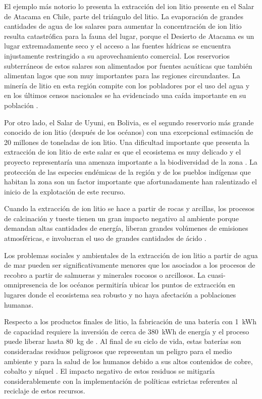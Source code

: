 El ejemplo más notorio lo presenta la extracción del ion litio presente en el Salar de Atacama en Chile, parte del triángulo del litio. La evaporación de grandes cantidades de agua de los salares para aumentar la concentración de ion litio resulta catastrófica para la fauna del lugar, porque el Desierto de Atacama es un lugar extremadamente seco y el acceso a las fuentes hídricas se encuentra injustamente restringido a su aprovechamiento comercial. Los reservorios subterráneos de estos salares son alimentados por fuentes acuáticas que también alimentan lagos que son muy importantes para las regiones circundantes. La minería de litio en esta región compite con los pobladores por el uso del agua y en los últimos  censos nacionales se ha evidenciado una caída importante en su población \citep{Romero2012, LIU202012}.

Por otro lado, el Salar de Uyuni, en Bolivia, es el segundo reservorio más grande conocido de ion litio (después de los océanos) con una excepcional estimación de 20 millones de toneladas de ion litio. Una dificultad importante que presenta la extracción de ion litio de este salar es que el ecosistema es muy delicado y el proyecto representaría una amenaza importante a la biodiversidad de la zona \citep{Hancock2018}. La protección de las especies endémicas de la región y de los pueblos indígenas que habitan la zona son un factor importante que afortunadamente han ralentizado el inicio de la explotación de este recurso.

Cuando la extracción de ion litio se hace a partir de rocas y arcillas, los procesos de calcinación y tueste tienen un gran impacto negativo al ambiente porque demandan altas cantidades de energía, liberan grandes volúmenes de emisiones atmosféricas, e involucran el uso de grandes cantidades de ácido \citep{Hancock2018}.

Los problemas sociales y ambientales de la extracción de ion litio a partir de agua de mar pueden ser significativamente menores que los asociados a los procesos de recobro a partir de salmueras y minerales rocosos o arcillosos. La cuasi-omnipresencia de los océanos permitiría ubicar los puntos de extracción en lugares donde el ecosistema sea robusto y no haya afectación a poblaciones humanas.

Respecto a los productos finales de litio, la fabricación de una batería con 1~kWh de capacidad requiere la inversión de cerca de 380~kWh de energía y el proceso puede liberar hasta 80~kg de  \citep{Chagnes2015}. Al final de su ciclo de vida, estas baterías son consideradas residuos peligrosos que representan un peligro para el medio ambiente y para la salud de los humanos debido a sus altos contenidos de cobre, cobalto y níquel \citep{Kang2013}. El impacto negativo de estos residuos se mitigaría considerablemente con la implementación de políticas estrictas referentes al reciclaje de estos recursos.
